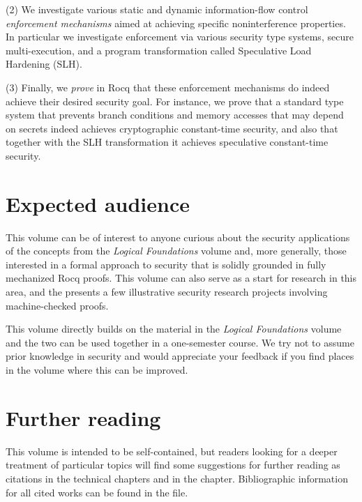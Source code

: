 \documentclass[12pt]{report}
\begin{document}
 (2) We investigate various static and dynamic information-flow control
    \textit{enforcement mechanisms} aimed at achieving specific noninterference
    properties. In particular we investigate enforcement via various security
    type systems, secure multi-execution, and a program transformation called
    Speculative Load Hardening (SLH). 

 (3) Finally, we \textit{prove} in Rocq that these enforcement mechanisms do indeed
    achieve their desired security goal. For instance, we prove that a standard
    type system that prevents branch conditions and memory accesses that may
    depend on secrets indeed achieves cryptographic constant-time security, and
    also that together with the SLH transformation it achieves speculative
    constant-time security. 
\begin{coqdoccode}
\coqdocemptyline
\end{coqdoccode}
\section{Expected audience}



 This volume can be of interest to anyone curious about the security
    applications of the concepts from the \textit{Logical Foundations} volume and, more
    generally, those interested in a formal approach to security that is
    solidly grounded in fully mechanized Rocq proofs. This volume can also serve
    as a start for research in this area, and the  presents a
    few illustrative security research projects involving machine-checked proofs.


    This volume directly builds on the material in the \textit{Logical Foundations}
    volume and the two can be used together in a one-semester course.  We try
    not to assume prior knowledge in security and would appreciate your feedback
    if you find places in the volume where this can be improved. 
\begin{coqdoccode}
\coqdocemptyline
\end{coqdoccode}
\section{Further reading}



 This volume is intended to be self-contained, but readers looking for a
    deeper treatment of particular topics will find some suggestions for further
    reading as citations in the technical chapters and in the 
    chapter. Bibliographic information for all cited works can be found in the
     file. 
\begin{coqdoccode}
\coqdocemptyline
\end{coqdoccode}
\end{document}
